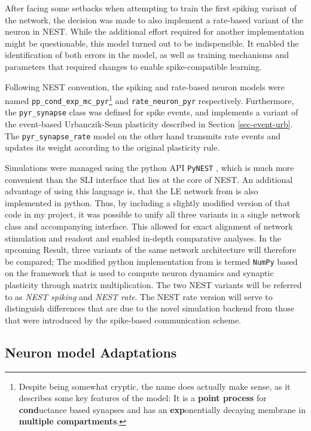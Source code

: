 After facing some setbacks when attempting to train the first spiking variant of the network, the decision was made to
also implement a rate-based variant of the neuron in NEST.  While the additional effort required for another
implementation might be questionable, this model turned out to be indispensible. It enabled the identification of both
errors in the model, as well as training mechanisms and parameters that required changes to enable spike-compatible
learning.

Following NEST convention, the spiking and rate-based neuron models were named
\texttt{pp\_cond\_exp\_mc\_pyr}\footnote{Despite being somewhat cryptic, the name does actually make sense, as it
describes some key features of the model: It is a \textbf{point process} for \textbf{cond}uctance based synapses and has
an \textbf{exp}onentially decaying membrane in \textbf{multiple compartments}.} and \texttt{rate\_neuron\_pyr}
respectively. Furthermore, the \texttt{pyr\_synapse} class was defined for spike events, and implements a variant of the
event-based Urbanczik-Senn plasticity described in Section \ref{sec-event-urb}. The \texttt{pyr\_synapse\_rate} model on
the other hand transmits rate events and updates its weight according to the original plasticity rule.

Simulations were managed using the python API \texttt{PyNEST} \citep{Eppler2009}, which is much more convenient than the
SLI interface that lies at the core of NEST. An additional advantage of using this language is, that the LE network from
\citep{Haider2021} is also implemented in python. Thus, by including a slightly modified version of that code in my
project, it was possible to unify all three variants in a single network class and accompanying interface. This allowed
for exact alignment of network stimulation and readout and enabled in-depth comparative analyses. In the upcoming
Result, three variants of the same network architecture will therefore be compared; The modified python implementation
from \citep{Haider2021} is termed \texttt{NumPy} based on the framework that is used to compute neuron dynamics and
synaptic plasticity through matrix multiplication. The two NEST variants will be referred to as \textit{NEST spiking}
and \textit{NEST rate}. The NEST rate version will serve to distinguish differences that are due to the novel simulation
backend from those that were introduced by the spike-based communication scheme.

\subsection{Neuron model Adaptations}

